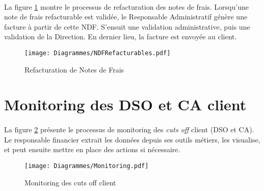 \paragraph{}La figure \ref{NDFRefacturables} montre le processus de refacturation des notes de frais. Lorsqu'une note de frais refacturable est validée, le Responsable Administratif génère une facture à partir de cette NDF. S'ensuit une validation administrative, puis une validation de la Direction. En dernier lieu, la facture est envoyée au client.


\begin{figure}
	\centering
		\texttt{[image: Diagrammes/NDFRefacturables.pdf]}
	\caption{Refacturation de Notes de Frais}
	\label{NDFRefacturables}	
\end{figure}


\section{Monitoring des DSO et CA client}

\paragraph{} La figure \ref{monitoringCO} présente le processus de monitoring des \textit{cuts off} client (DSO et CA). Le responsable financier extrait les données depuis ses outils métiers, les visualise, et peut ensuite mettre en place des actions si nécessaire.

\begin{figure}
	\centering
		\texttt{[image: Diagrammes/Monitoring.pdf]}
	\caption{Monitoring des cuts off client}
	\label{monitoringCO}	
\end{figure}
